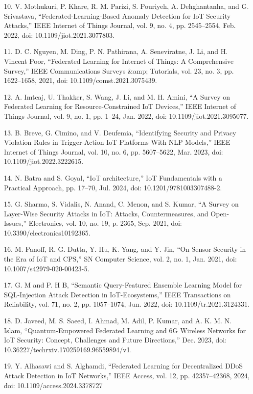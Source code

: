 10. V. Mothukuri, P. Khare, R. M. Parizi, S. Pouriyeh, A. Dehghantanha,
and G. Srivastava, ``Federated-Learning-Based Anomaly Detection for IoT
Security Attacks,'' IEEE Internet of Things Journal, vol. 9, no. 4, pp.
2545--2554, Feb. 2022, doi: 10.1109/jiot.2021.3077803.

11. D. C. Nguyen, M. Ding, P. N. Pathirana, A. Seneviratne, J. Li, and
H. Vincent Poor, ``Federated Learning for Internet of Things: A
Comprehensive Survey,'' IEEE Communications Surveys \&amp; Tutorials,
vol. 23, no. 3, pp. 1622--1658, 2021, doi: 10.1109/comst.2021.3075439.

12. A. Imteaj, U. Thakker, S. Wang, J. Li, and M. H. Amini, ``A Survey
on Federated Learning for Resource-Constrained IoT Devices,'' IEEE
Internet of Things Journal, vol. 9, no. 1, pp. 1--24, Jan. 2022, doi:
10.1109/jiot.2021.3095077.

13. B. Breve, G. Cimino, and V. Deufemia, ``Identifying Security and
Privacy Violation Rules in Trigger-Action IoT Platforms With NLP
Models,'' IEEE Internet of Things Journal, vol. 10, no. 6, pp.
5607--5622, Mar. 2023, doi: 10.1109/jiot.2022.3222615.

14. N. Batra and S. Goyal, ``IoT architecture,'' IoT Fundamentals with a
Practical Approach, pp. 17--70, Jul. 2024, doi: 10.1201/9781003307488-2.

15. G. Sharma, S. Vidalis, N. Anand, C. Menon, and S. Kumar, ``A Survey
on Layer-Wise Security Attacks in IoT: Attacks, Countermeasures, and
Open-Issues,'' Electronics, vol. 10, no. 19, p. 2365, Sep. 2021, doi:
10.3390/electronics10192365.

16. M. Panoff, R. G. Dutta, Y. Hu, K. Yang, and Y. Jin, ``On Sensor
Security in the Era of IoT and CPS,'' SN Computer Science, vol. 2, no.
1, Jan. 2021, doi: 10.1007/s42979-020-00423-5.

17. G. M and P. H B, ``Semantic Query-Featured Ensemble Learning Model
for SQL-Injection Attack Detection in IoT-Ecosystems,'' IEEE
Transactions on Reliability, vol. 71, no. 2, pp. 1057--1074, Jun. 2022,
doi: 10.1109/tr.2021.3124331.

18. D. Javeed, M. S. Saeed, I. Ahmad, M. Adil, P. Kumar, and A. K. M. N.
Islam, ``Quantum-Empowered Federated Learning and 6G Wireless Networks
for IoT Security: Concept, Challenges and Future Directions,'' Dec.
2023, doi: 10.36227/techrxiv.170259169.96559894/v1.

19. Y. Alhasawi and S. Alghamdi, ``Federated Learning for Decentralized
DDoS Attack Detection in IoT Networks,'' IEEE Access, vol. 12, pp.
42357--42368, 2024, doi: 10.1109/access.2024.3378727

